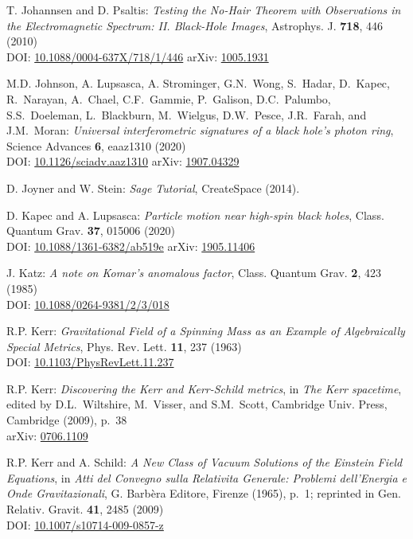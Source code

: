 \begin{thebibliography}{123}
T. Johannsen and D. Psaltis:
{\em Testing the No-Hair Theorem with Observations in the Electromagnetic Spectrum: II. Black-Hole Images},
Astrophys. J. {\bf 718}, 446 (2010)\\
DOI: \href{https://doi.org/10.1088/0004-637X/718/1/446}{10.1088/0004-637X/718/1/446}\hfill
arXiv: \href{https://arxiv.org/abs/1005.1931}{1005.1931}

M.D. Johnson, A. Lupsasca, A. Strominger, G.N.~Wong, S.~Hadar, D.~Kapec, R.~Narayan, A.~Chael,
C.F.~Gammie, P.~Galison, D.C.~Palumbo, S.S.~Doeleman, L.~Blackburn, M.~Wielgus, D.W.~Pesce,
J.R.~Farah, and J.M.~Moran:
{\em Universal interferometric signatures of a black hole's photon ring},
Science Advances {\bf 6}, eaaz1310 (2020)\\
DOI: \href{https://doi.org/10.1126/sciadv.aaz1310}{10.1126/sciadv.aaz1310}\hfill
arXiv: \href{https://arxiv.org/abs/1907.04329}{1907.04329}

D. Joyner and W. Stein: {\em Sage Tutorial}, CreateSpace (2014).

D. Kapec and A. Lupsasca:
{\em Particle motion near high-spin black holes},
Class. Quantum Grav. {\bf 37}, 015006 (2020)\\
DOI: \href{https://doi.org/10.1088/1361-6382/ab519e}{10.1088/1361-6382/ab519e}\hfill
arXiv: \href{https://arxiv.org/abs/1905.11406}{1905.11406}

J. Katz:
{\em A note on Komar's anomalous factor},
Class. Quantum Grav. {\bf 2}, 423 (1985)\\
DOI: \href{https://doi.org/10.1088/0264-9381/2/3/018}{10.1088/0264-9381/2/3/018}

R.P. Kerr:
{\em Gravitational Field of a Spinning Mass as an Example of Algebraically Special Metrics},
Phys. Rev. Lett. {\bf 11}, 237 (1963)\\
DOI: \href{https://doi.org/10.1103/PhysRevLett.11.237}{10.1103/PhysRevLett.11.237}

R.P. Kerr: {\em Discovering the Kerr and Kerr-Schild metrics},
in {\em The Kerr spacetime}, edited by D.L.~Wiltshire, M.~Visser, and S.M.~Scott,
Cambridge Univ. Press, Cambridge (2009), p.~38\\
arXiv: \href{https://arxiv.org/abs/0706.1109}{0706.1109}

R.P. Kerr and A. Schild:
{\em A New Class of Vacuum Solutions of the Einstein Field Equations},
in {\em Atti del Convegno sulla Relativita Generale: Problemi
dell’Energia e Onde Gravitazionali}, G. Barbèra Editore,
Firenze (1965), p.~1; reprinted in
Gen. Relativ. Gravit. {\bf 41}, 2485 (2009)\\
DOI: \href{https://doi.org/10.1007/s10714-009-0857-z}{10.1007/s10714-009-0857-z}


\end{thebibliography}

